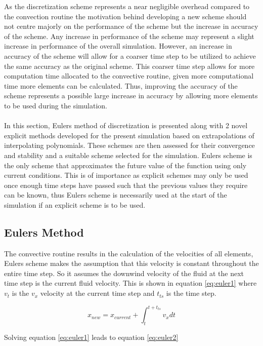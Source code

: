 As the discretization scheme represents a near negligible overhead compared to the convection routine the motivation behind developing a new scheme should not centre majorly on the performance of the scheme but the increase in accuracy of the scheme. Any increase in performance of the scheme may represent a slight increase in performance of the overall simulation. However, an increase in accuracy of the scheme will allow for a coarser time step to be utilized to achieve the same accuracy as the original scheme. This coarser time step allows for more computation time allocated to the convective routine, given more computational time more elements can be calculated. Thus, improving the accuracy of the scheme represents a possible large increase in accuracy by allowing more elements to be used during the simulation.
\\\\
In this section, Eulers method of discretization is presented along with 2 novel explicit methods developed for the present simulation based on extrapolations of interpolating polynomials. These schemes are then assessed for their convergence and stability and a suitable scheme selected for the simulation. Eulers scheme is the only scheme that approximates the future value of the function using only current conditions. This is of importance as explicit schemes may only be used once enough time steps have passed such that the previous values they require can be known, thus Eulers scheme is necessarily used at the start of the simulation if an explicit scheme is to be used.

\subsection{Eulers Method}
The convective routine results in the calculation of the velocities of all elements, Eulers scheme makes the assumption that this velocity is constant throughout the entire time step. So it assumes the downwind velocity of the fluid at the next time step is the current fluid velocity. This is shown in equation \ref{eq:euler1} where $v_t$ is the $v_x$ velocity at the current time step and $t_{ts}$ is the time step.

\begin{equation}
\label{eq:euler1}
x_{new}=x_{current}+\int_{t}^{t+t_{ts}} v_{x}dt
\end{equation}

Solving equation \ref{eq:euler1} leads to equation \ref{eq:euler2}


